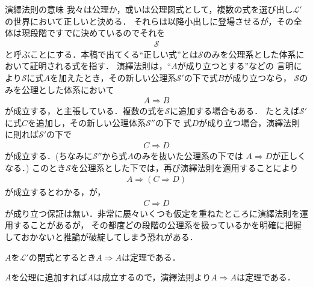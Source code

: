	\begin{itembox}[l]{演繹法則の意味}
		我々は公理か，或いは公理図式として，複数の式を選び出し$\mathcal{L}'$の世界において正しいと決める．
		それらは以降小出しに登場させるが，その全体は現段階ですでに決めているのでそれを
		\begin{align}
			\mathscr{S}
		\end{align}
		と呼ぶことにする．本稿で出てくる``正しい式''とは$\mathscr{S}$のみを公理系とした体系において証明される式を指す．
		演繹法則は，``$A$が成り立つとする''などの
		言明により$\mathscr{S}$に式$A$を加えたとき，その新しい公理系$\mathscr{S}'$の下で式$B$が成り立つなら，
		$\mathscr{S}$のみを公理とした体系において
		\begin{align}
			A \Longrightarrow B
		\end{align}
		が成立する，と主張している．複数の式を$\mathscr{S}$に追加する場合もある．
		たとえば$\mathscr{S}'$に式$C$を追加し，その新しい公理体系$\mathscr{S}''$の下で
		式$D$が成り立つ場合，演繹法則に則れば$\mathscr{S}'$の下で
		\begin{align}
			C \Longrightarrow D
		\end{align}
		が成立する．(ちなみに$\mathscr{S}''$から式$A$のみを抜いた公理系の下では
		$A \Longrightarrow D$が正しくなる．)
		このとき$\mathscr{S}$を公理系とした下では，再び演繹法則を適用することにより
		\begin{align}
			A \Longrightarrow (C \Longrightarrow D)
		\end{align}
		が成立するとわかる，が，
		\begin{align}
			C \Longrightarrow D
		\end{align}
		が成り立つ保証は無い．非常に屡々いくつも仮定を重ねたところに演繹法則を運用することがあるが，
		その都度どの段階の公理系を扱っているかを明確に把握しておかないと推論が破綻してしまう恐れがある．
	\end{itembox}
	
	\begin{screen}
		\begin{logicalthm}[含意の反射律]\label{logicalthm:reflective_law_of_implication}
			$A$を$\mathcal{L}'$の閉式とするとき$A \Longrightarrow A$は定理である．
		\end{logicalthm}
	\end{screen}
	
	\begin{prf}
		$A$を公理に追加すれば$A$は成立するので，演繹法則より$A \Longrightarrow A$は定理である．
		\QED
	\end{prf}
	
